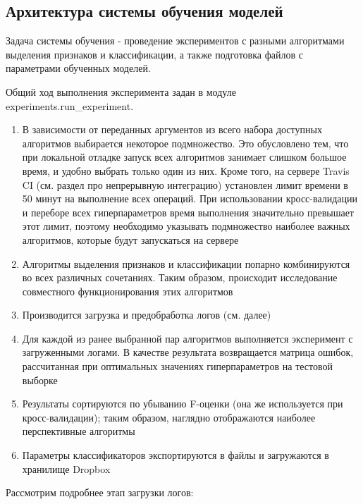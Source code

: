 \subsection{Архитектура системы обучения моделей}

Задача системы обучения - проведение экспериментов с разными алгоритмами выделения признаков и классификации, а также подготовка файлов с параметрами обученных моделей.

Общий ход выполнения эксперимента задан в модуле experiments.run\_experiment. 

\begin{enumerate}
\item В зависимости от переданных аргументов из всего набора доступных алгоритмов выбирается некоторое подмножество. Это обусловлено тем, что при локальной отладке запуск всех алгоритмов занимает слишком большое время, и удобно выбрать только один из них. Кроме того, на сервере Travis CI (см. раздел про непрерывную интеграцию) установлен лимит времени в 50 минут на выполнение всех операций. При использовании кросс-валидации и переборе всех гиперпараметров время выполнения значительно превышает этот лимит, поэтому необходимо указывать подмножество наиболее важных алгоритмов, которые будут запускаться на сервере
\item Алгоритмы выделения признаков и классификации попарно комбинируются во всех различных сочетаниях. Таким образом, происходит исследование совместного функционирования этих алгоритмов
\item Производится загрузка и предобработка логов (см. далее)
\item Для каждой из ранее выбранной пар алгоритмов выполняется эксперимент с загруженными логами. В качестве результата возвращается матрица ошибок, рассчитанная при оптимальных значениях гиперпараметров на тестовой выборке
\item Результаты сортируются по убыванию F-оценки (она же используется при кросс-валидации); таким образом, наглядно отображаются наиболее перспективные алгоритмы
\item Параметры классификаторов экспортируются в файлы и загружаются в хранилище Dropbox 
\end{enumerate}

Рассмотрим подробнее этап загрузки логов:


